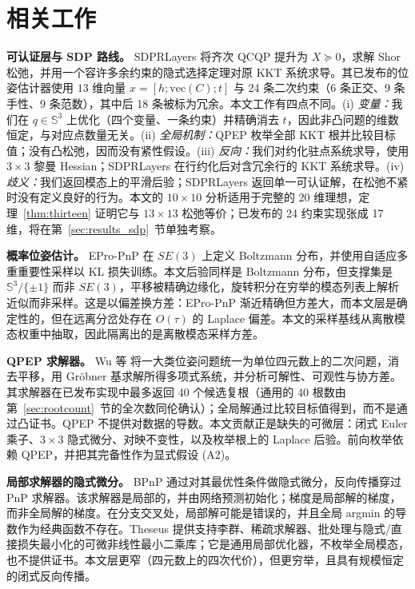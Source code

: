 \section{相关工作}\label{sec:related}

\textbf{可认证层与 SDP 路线。} SDPRLayers \cite{holmes2025sdpr} 将齐次 QCQP 提升为 $X\succeq0$，求解 Shor 松弛，并用一个容许多余约束的隐式选择定理对原 KKT 系统求导。其已发布的位姿估计器使用 $13$ 维向量 $x=[h;\mathrm{vec}(C);t]$ 与 24 条二次约束（6 条正交、9 条手性、9 条范数），其中后 18 条被标为冗余。本文工作有四点不同。(i) \emph{变量：}我们在 $q\in\mathbb{S}^3$ 上优化（四个变量、一条约束）并精确消去 $t$，因此非凸问题的维数恒定，与对应点数量无关。(ii) \emph{全局机制：}QPEP 枚举全部 KKT 根并比较目标值；没有凸松弛，因而没有紧性假设。(iii) \emph{反向：}我们对约化驻点系统求导，使用 $3\times3$ 黎曼 Hessian；SDPRLayers 在行约化后对含冗余行的 KKT 系统求导。(iv) \emph{歧义：}我们返回模态上的平滑后验；SDPRLayers 返回单一可认证解，在松弛不紧时没有定义良好的行为。本文的 $10\times10$ 分析适用于完整的 20 维理想，定理~\ref{thm:thirteen} 证明它与 $13\times13$ 松弛等价；已发布的 24 约束实现张成 17 维，将在第~\ref{sec:results_sdp}~节单独考察。

\textbf{概率位姿估计。} EPro-PnP \cite{chen2022epropnp} 在 $SE(3)$ 上定义 Boltzmann 分布，并使用自适应多重重要性采样以 KL 损失训练。本文后验同样是 Boltzmann 分布，但支撑集是 $\mathbb{S}^3/\{\pm1\}$ 而非 $SE(3)$，平移被精确边缘化，旋转积分在穷举的模态列表上解析近似而非采样。这是以偏差换方差：EPro-PnP 渐近精确但方差大，而本文层是确定性的，但在远离分岔处存在 $O(\tau)$ 的 Laplace 偏差。本文的采样基线从离散模态权重中抽取，因此隔离出的是离散模态采样方差。

\textbf{QPEP 求解器。} Wu 等 \cite{wu2022qpep} 将一大类位姿问题统一为单位四元数上的二次问题，消去平移，用 Gr\"obner 基求解所得多项式系统，并分析可解性、可观性与协方差。其求解器在已发布实现中最多返回 40 个候选复根（通用的 40 根数由第~\ref{sec:rootcount}~节的全次数同伦确认）；全局解通过比较目标值得到，而不是通过凸证书。QPEP 不提供对数据的导数。本文贡献正是缺失的可微层：闭式 Euler 乘子、$3\times3$ 隐式微分、对映不变性，以及枚举根上的 Laplace 后验。前向枚举依赖 QPEP，并把其完备性作为显式假设 (A2)。

\textbf{局部求解器的隐式微分。} BPnP \cite{chen2020bpn} 通过对其最优性条件做隐式微分，反向传播穿过 PnP 求解器。该求解器是局部的，并由网络预测初始化；梯度是局部解的梯度，而非全局解的梯度。在分支交叉处，局部解可能是错误的，并且全局 argmin 的导数作为经典函数不存在。Theseus \cite{pineda2022theseus} 提供支持李群、稀疏求解器、批处理与隐式/直接损失最小化的可微非线性最小二乘库；它是通用局部优化器，不枚举全局模态，也不提供证书。本文层更窄（四元数上的四次代价），但更穷举，且具有规模恒定的闭式反向传播。


